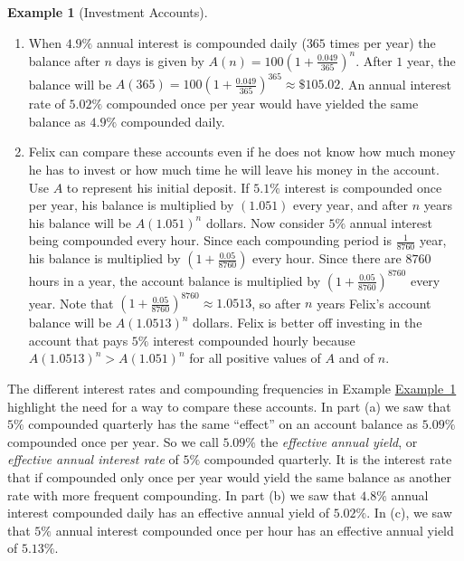 \documentclass[10pt,]{book}
\theoremstyle{plain}
\theoremstyle{definition}
\theoremstyle{definition}
\newtheorem{example}[theorem]{Example}
\theoremstyle{definition}
\numberwithin{equation}{section}
\begin{document}
\begin{example}[Investment Accounts]
\begin{enumerate}
\item\hypertarget{li-102}{}When \(4.9\%\) annual interest is compounded daily (\(365\) times per year) the balance after \(n\) days is given by  \(A(n)=100(1+\frac{0.049}{365})^n\). After \(1\) year, the balance will be \(A(365) = 100(1+\frac{0.049}{365})^{365} \approx \$105.02\). An annual interest rate of \(5.02\%\) compounded once per year would have yielded the same balance as \(4.9\%\) compounded daily.%
\item\hypertarget{li-103}{}Felix can compare these accounts even if he does not know how much money he has to invest or how much time he will leave his money in the account.  Use \(A\) to represent his initial deposit.  If \(5.1\%\) interest is compounded once per year, his balance is multiplied by \((1.051)\) every year, and after \(n\) years his balance will be \(A(1.051)^n\) dollars. Now consider \(5\%\) annual interest being compounded every hour.  Since each compounding period is \(\frac{1}{8760}\) year, his balance is multiplied by \((1+\frac{0.05}{8760})\) every hour. Since there are \(8760\) hours in a year, the account balance is multiplied by \((1+\frac{0.05}{8760})^{8760}\) every year. Note that \((1 + \frac{0.05}{8760} )^{8760} \approx 1.0513\), so after \(n\) years Felix’s account balance will be \(A(1.0513)^n\) dollars. Felix is better off investing in the account that pays \(5\%\) interest compounded hourly because \(A(1.0513)^n > A(1.051)^n\) for all positive values of \(A\) and of \(n\).%
\end{enumerate}
\end{example}
The different interest rates and compounding frequencies in Example \hyperref[chapter04-section05-investment-accounts]{Example~1} highlight the need for a way to compare these accounts. In part (a) we saw that \(5\%\) compounded quarterly has the same “effect” on an account balance as \(5.09\%\) compounded once per year. So we call \(5.09\%\) the \emph{effective annual yield}, or \emph{effective annual interest rate} of \(5\%\) compounded quarterly.  It is the interest rate that if compounded only once per year would yield the same balance as another rate with more frequent compounding. In part (b) we saw that \(4.8\%\) annual interest compounded daily has an effective annual yield of \(5.02\%\). In (c), we saw that \(5\%\) annual interest compounded once per hour has an effective annual yield of \(5.13\%\).%
\typeout{************************************************}
\typeout{************************************************}
\end{document}
